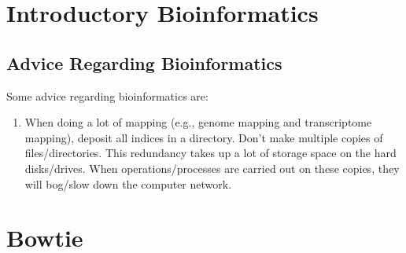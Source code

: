 \section{Introductory Bioinformatics}
\label{sec:IntroductoryBioinformatics}





\subsection{Advice Regarding Bioinformatics}
\label{ssec:BioinformaticsAdvice}

Some advice regarding bioinformatics are: \vspace{-0.3cm}
\begin{enumerate} \itemsep -4pt
\item When doing a lot of mapping (e.g., genome mapping and transcriptome mapping), deposit all indices in a directory. Don't make multiple copies of files/directories. This redundancy takes up a lot of storage space on the hard disks/drives. When operations/processes are carried out on these copies, they will bog/slow down the computer network.
\end{enumerate}




\section{Bowtie}
\label{sec:Bowtie}


